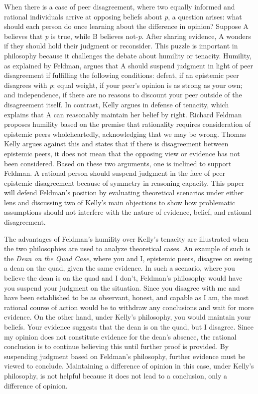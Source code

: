 
When there is a case of peer disagreement, where two equally informed and rational individuals arrive at opposing beliefs about \emph{p}, a question arises: what should each person do once learning about the difference in opinion? Suppose A believes that \emph{p} is true, while B believes not-\emph{p}. After sharing evidence, A wonders if they should hold their judgment or reconsider. This puzzle is important in philosophy because it challenges the debate about humility or tenacity. Humility, as explained by Feldman, argues that A should suspend judgment in light of peer disagreement if fulfilling the following conditions: defeat, if an epistemic peer disagrees with \emph{p}; equal weight, if your peer’s opinion is as strong as your own; and independence, if there are no reasons to discount your peer outside of the disagreement itself. In contrast, Kelly argues in defense of tenacity, which explains that A can reasonably maintain her belief by right. Richard Feldman proposes humility based on the premise that rationality requires consideration of epistemic peers wholeheartedly, acknowledging that we may be wrong. Thomas Kelly argues against this and states that if there is disagreement between epistemic peers, it does not mean that the opposing view or evidence has not been considered. Based on these two arguments, one is inclined to support Feldman. A rational person should suspend judgment in the face of peer epistemic disagreement because of symmetry in reasoning capacity. This paper will defend Feldman’s position by evaluating theoretical scenarios under either lens and discussing two of Kelly’s main objections to show how problematic assumptions should not interfere with the nature of evidence, belief, and rational disagreement. 

The advantages of Feldman’s humility over Kelly’s tenacity are illustrated when the two philosophies are used to analyze theoretical cases. An example of such is the \emph{Dean on the Quad Case}, where you and I, epistemic peers, disagree on seeing a dean on the quad, given the same evidence. In such a scenario, where you believe the dean is on the quad and I don’t, Feldman’s philosophy would have you suspend your judgment on the situation. Since you disagree with me and have been established to be as observant, honest, and capable as I am, the most rational course of action would be to withdraw any conclusions and wait for more evidence. On the other hand, under Kelly’s philosophy, you would maintain your beliefs. Your evidence suggests that the dean is on the quad, but I disagree. Since my opinion does not constitute evidence for the dean’s absence, the rational conclusion is to continue believing this until further proof is provided. By suspending judgment based on Feldman’s philosophy, further evidence must be viewed to conclude. Maintaining a difference of opinion in this case, under Kelly’s philosophy, is not helpful because it does not lead to a conclusion, only a difference of opinion. 

